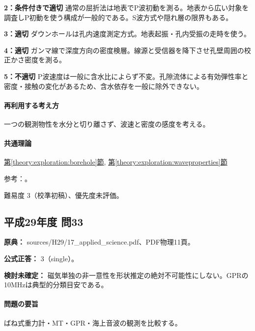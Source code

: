 \noindent\textbf{2：条件付きで適切} 通常の屈折法は地表でP波初動を測る。地表から広い対象を調査しP初動を使う構成が一般的である。S波方式や隠れ層の限界もある。\par

\noindent\textbf{3：適切} ダウンホールは孔内速度測定方式。地表起振・孔内受振の走時を使う。\par

\noindent\textbf{4：適切} ガンマ線で深度方向の密度検層。線源と受信器を降下させ孔壁周囲の校正かさ密度を測る。\par

\noindent\textbf{5：不適切} P波速度は一般に含水比によらず不変。孔隙流体による有効弾性率と密度・接触の変化があるため、含水依存を一般に除外できない。\par

\paragraph{再利用する考え方} 一つの観測物性を水分と切り離さず、波速と密度の感度を考える。

\paragraph{共通理論} \hyperref[theory:exploration:borehole]{第\ref*{theory:exploration:borehole}節}, \hyperref[theory:exploration:waveproperties]{第\ref*{theory:exploration:waveproperties}節}

\par 参考：\cite{epa_gamma_density,geebec_ps,epa_seismic_refraction}。

\par 難易度 3（校準初稿）、優先度未評価。

\subsection{平成29年度 問33}
\label{q:h29-reg-applied-33}

\noindent\textbf{原典：} sources/H29/17\_applied\_science.pdf、PDF物理11頁。

\textbf{公式正答：} 3（single）。

\par\textbf{検討未確定：} 磁気単独の非一意性を形状推定の絶対不可能性にしない。GPRの10MHzは典型的分類目安である。

\paragraph{問題の要旨} ばね式重力計・MT・GPR・海上音波の観測を比較する。

